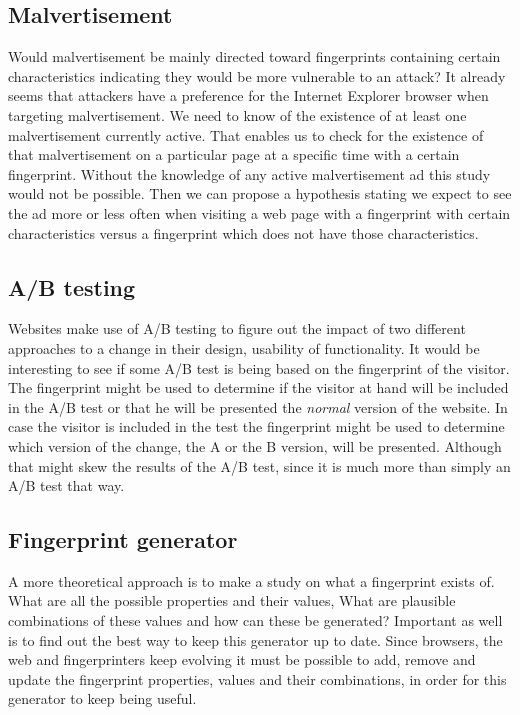 \subsection{Malvertisement}

Would malvertisement be mainly directed toward
fingerprints containing certain characteristics
indicating they would be more vulnerable to an attack?
It already seems that attackers have a preference
for the Internet Explorer browser
when targeting malvertisement.
\citep{li2012knowing}
We need to know of the existence of at least
one malvertisement currently active.
That enables us to check for the existence of that malvertisement
on a particular page at a specific time with a certain fingerprint.
Without the knowledge of any active malvertisement ad
this study would not be possible.
Then we can propose a hypothesis
stating we expect to see the ad more or less often
when visiting a web page with a fingerprint with certain characteristics
versus a fingerprint which does not have those characteristics.

\subsection{A/B testing}
Websites make use of A/B testing to figure out the impact
of two different approaches to a change
in their design, usability of functionality.
It would be interesting to see if some A/B test
is being based on the fingerprint of the visitor.
The fingerprint might be used to determine
if the visitor at hand will be included in the A/B test
or that he will be presented the \emph{normal} version of the website.
In case the visitor is included in the test
the fingerprint might be used to determine which version of the change,
the A or the B version, will be presented.
Although that might skew the results of the A/B test,
since it is much more than simply an A/B test that way.

\subsection{Fingerprint generator}
A more theoretical approach is to make a study on what a fingerprint exists of.
What are all the possible properties and their values,
What are plausible combinations of these values
and how can these be generated?
Important as well is to find out the best way
to keep this generator up to date.
Since browsers, the web and fingerprinters keep evolving
it must be possible to add, remove and update
the fingerprint properties, values and their combinations,
in order for this generator to keep being useful.

